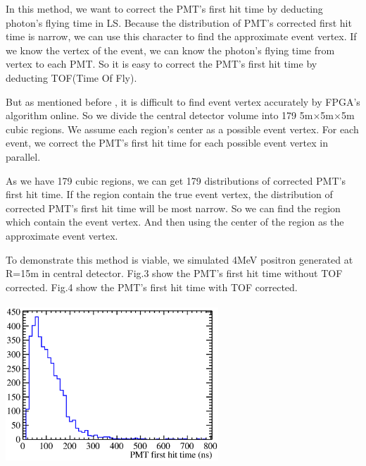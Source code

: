 \documentclass[a4paper,10pt,twoside]{paper}
\begin{document}
\begin{multicols}{2}
		In this method, we want to correct the PMT's first
		hit time by deducting photon's flying time in LS. 
		Because the distribution of PMT's corrected first hit time
		is narrow, we can use this character to find the approximate event vertex. 
		If we know the vertex of the event, we can know the photon's flying time from vertex to each
		PMT.
		So it is easy to correct the PMT's first hit time
		by deducting TOF(Time Of Fly).

		But as mentioned before , it is difficult to find event
		vertex accurately by FPGA's algorithm online. So we
		divide the central detector volume into 179 5m$\times$5m$\times$5m
		cubic regions. We assume each region's center as a possible event vertex.
		For each event, we correct the PMT's 
		first hit time for each possible event vertex in parallel.


		As we have 179 cubic regions, we can get 179 distributions of corrected 
		PMT's first hit time. 
		If the region contain the true event vertex, 
		the distribution of corrected PMT's first hit time 
		will be most narrow.
		So we can find the region which contain the event vertex. 
		And then using the center of the region as the approximate
		event vertex.

		To demonstrate this method is viable, we simulated 4MeV 
		positron generated at R=15m in central detector. 
		Fig.3 show the PMT's first hit time without TOF corrected.
		Fig.4 show the PMT's first hit time with TOF corrected.


		\begin{center}
			\includegraphics[width=8cm,height=6cm]{4MeV_e+_PMT_first_hitTime.eps}
		\end{center}



\end{multicols}
\end{document}
